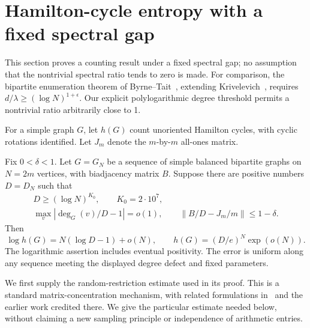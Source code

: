 \section{Hamilton-cycle entropy with a fixed spectral gap}
\label{sec:enumeration}
This section proves a counting result under a fixed spectral gap;
no assumption that the nontrivial spectral ratio tends to zero
is made. For comparison, the bipartite enumeration theorem of
Byrne--Tait~\cite[Theorem 7]{BT}, extending Krivelevich~\cite{Krivelevich},
requires \(d/\lambda\geq(\log N)^{1+\epsilon}\).
Our explicit polylogarithmic degree threshold permits a
nontrivial ratio arbitrarily close to 1.

For a simple graph \(G\), let \(h(G)\) count unoriented Hamilton
cycles, with cyclic rotations identified.
Let \(J_m\) denote the \(m\)-by-\(m\) all-ones matrix.

\begin{theorem}
\label{thm:hamiltonentropy}
Fix \(0<\delta<1\).
Let \(G=G_N\) be a sequence of simple balanced bipartite
graphs on \(N=2m\) vertices, with biadjacency matrix \(B\).
Suppose there are positive numbers \(D=D_N\) such that
\[
 \begin{gathered}
 D\geq(\log N)^{K_0},\qquad K_0=2\cdot10^7,\\
 \max_v|\deg_G(v)/D-1|=o(1),\qquad
 \left\|B/D-J_m/m\right\|\leq1-\delta .
 \end{gathered}
 \tag{43}
\]
Then
\[
 \log h(G)=N(\log D-1)+o(N),\qquad
 h(G)=(D/e)^N\exp(o(N)).                                    \tag{44}
\]
The logarithmic assertion includes eventual positivity.
The error is uniform along any sequence meeting the displayed
degree defect and fixed parameters.
\end{theorem}

We first supply the random-restriction estimate used in its proof.
This is a standard matrix-concentration mechanism, with
related formulations in~\cite[Lemmas 2.2--2.4]{Muyesser}
and the earlier work credited there.
We give the particular estimate needed below, without
claiming a new sampling principle or independence of
arithmetic entries.

